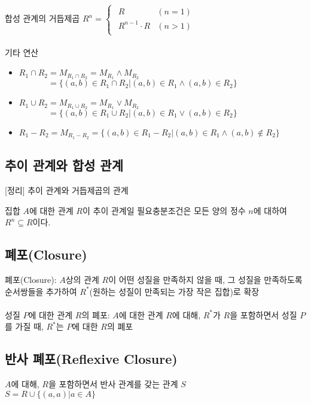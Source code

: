 합성 관계의 거듭제곱 $R^n = \begin{cases}
    \begin{array}{ll}
        R&(n=1)\\
        R^{n-1}\cdot R & (n > 1)
    \end{array}
\end{cases}$
\\\\
기타 연산
\begin{itemize}
    \item $R_1 \cap R_2 = M_{R_1 \cap R_2} = M_{R_1} \land M_{R_2}$\\
    $\phantom{R_1 \cap R_2} = \{(a, b) \in R_1 \cap R_2 | (a, b) \in R_1 \land (a, b) \in R_2\}$
    \item $R_1 \cup R_2 = M_{R_1 \cup R_2} = M_{R_1} \lor M_{R_2}$\\
    $\phantom{R_1 \cup R_2} = \{(a, b) \in R_1 \cup R_2 | (a, b) \in R_1 \lor (a, b) \in R_2\}$
    \item $R_1 - R_2 = M_{R_1-R_2} = \{(a, b) \in R_1 - R_2 | (a, b) \in R_1 \land (a, b) \not\in R_2\}$
\end{itemize}

\subsection{추이 관계와 합성 관계}
[정리] 추이 관계와 거듭제곱의 관계

집합 $A$에 대한 관계 $R$이 추이 관계일 필요충분조건은 모든 양의 정수 $n$에 대하여 $R^n \subseteq R$이다.

\subsection{폐포(Closure)}
폐포(Closure): $A$상의 관계 $R$이 어떤 성질을 만족하지 않을 때, 그 성질을 만족하도록 순서쌍들을 추가하여 $R^*$(원하는 성질이 만족되는 가장 작은 집합)로 확장\\\\
성질 $P$에 대한 관계 $R$의 폐포: $A$에 대한 관계 $R$에 대해, $R^*$가 $R$을 포함하면서 성질 $P$를 가질 때, $R^*$는 $P$에 대한 $R$의 폐포

\subsection{반사 폐포(Reflexive Closure)}
$A$에 대해, $R$을 포함하면서 반사 관계를 갖는 관계 $S$\\
$S = R \cup \{(a, a)|a \in A\}$

